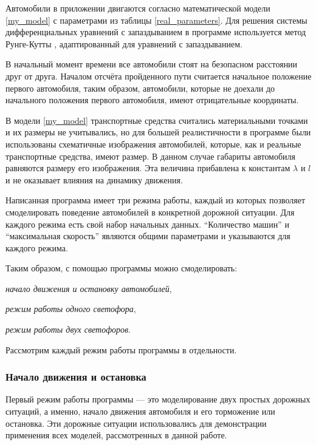 \documentclass[12pt, a4paper]{extarticle}
\renewenvironment{itemize}[1][{---\hfil}]{\begin{list}{#1}{\topsep=0pt\parsep=0pt plus 1pt\itemsep=\parsep\leftmargin=0pt \itemindent=\parindent}\addtolength{\itemindent}{\labelwidth}}{\end{list}}
\numberwithin{equation}{section}
\numberwithin{figure}{section}
\begin{document}
Автомобили в приложении двигаются согласно математической модели \eqref{my_model} с параметрами из таблицы \ref{real_parameters}. Для решения системы дифференциальных уравнений с запаздыванием в программе используется метод Рунге-Кутты \cite{Runge_Kutta}, адаптированный для уравнений с запаздыванием.

В начальный момент времени все автомобили стоят на безопасном расстоянии друг от друга. Началом отсчёта пройденного пути считается начальное положение первого автомобиля, таким образом, автомобили, которые не доехали до начального положения первого автомобиля, имеют отрицательные координаты.

В модели \eqref{my_model} транспортные средства считались материальными точками и их размеры не учитывались, но для большей реалистичности в программе были использованы схематичные изображения автомобилей, которые, как и реальные транспортные средства, имеют размер. В данном случае габариты автомобиля равняются размеру его изображения. Эта величина прибавлена к константам $\lambda$ и $l$ и не оказывает влияния на динамику движения.

Написанная программа имеет три режима работы, каждый из которых позволяет смоделировать поведение автомобилей в конкретной дорожной ситуации. Для каждого режима есть свой набор начальных данных. ``Количество машин'' и ``максимальная скорость'' являются общими параметрами и указываются для каждого режима.

\noindent Таким образом, с помощью программы можно смоделировать:

\begin{itemize} 
	\item \textit{начало движения и остановку автомобилей},
	\item \textit{режим работы одного светофора},
	\item \textit{режим работы двух светофоров}.
\end{itemize}

\noindent Рассмотрим каждый режим работы программы в отдельности.

\subsubsection{Начало движения и остановка}

Первый режим работы программы --- это моделирование двух простых дорожных ситуаций, а именно, начало движения автомобиля и его торможение или остановка. Эти дорожные ситуации использовались для демонстрации применения всех моделей, рассмотренных в данной работе.
\end{document}
